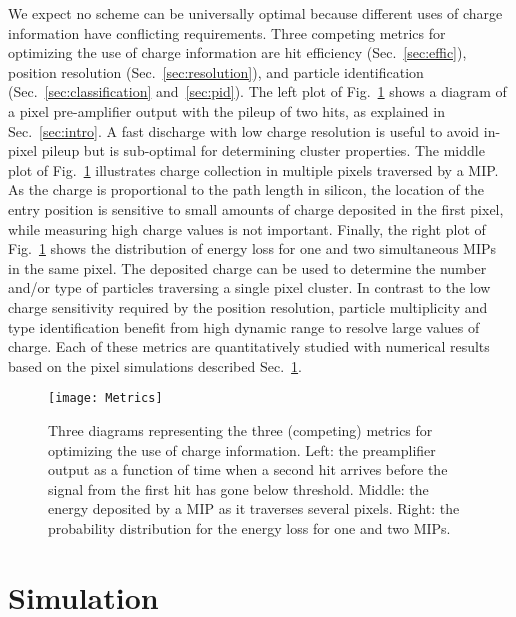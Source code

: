 \documentclass[12pt]{article}
\begin{document}
We expect no scheme can be universally optimal because different uses of charge information have conflicting requirements. 
Three competing metrics for optimizing the use of charge information are hit efficiency (Sec.~\ref{sec:effic}), 
position resolution  (Sec.~\ref{sec:resolution}), 
and particle identification (Sec.~\ref{sec:classification} and~\ref{sec:pid}). 
The left plot of Fig.~\ref{fig:ToTschematic} shows a diagram of a pixel pre-amplifier output with the pileup of two hits,
as explained in Sec.~\ref{sec:intro}. A fast discharge with low charge resolution is useful to avoid in-pixel pileup but is sub-optimal for determining cluster properties. 
The middle plot of Fig.~\ref{fig:ToTschematic} illustrates charge collection in multiple pixels traversed by a MIP.  
As the charge is proportional to the path length in silicon, the location of the entry position is sensitive to small amounts of charge deposited in the first pixel, while measuring high charge values is not important. 
Finally, the right plot of Fig.~\ref{fig:ToTschematic} shows the distribution of energy loss for one and two simultaneous MIPs in the same pixel.  The deposited charge can be used to determine the number and/or type of particles traversing a single pixel cluster. 
In contrast to the low charge sensitivity required by the position resolution, particle multiplicity and type identification benefit from high dynamic range to resolve large values of charge.  
Each of these metrics are quantitatively studied with numerical results based on the pixel simulations described 
Sec.~\ref{sec:sim}.

\begin{figure}[h!]
\centering
\texttt{[image: Metrics]}
\caption{Three diagrams representing the three (competing) metrics for optimizing the use of charge information.  Left: the preamplifier output as a function of time when a second hit arrives before the signal from the first hit has gone below threshold.  Middle: the energy deposited by a MIP as it traverses several pixels.  Right: the probability distribution for the energy loss for one and two MIPs.}
\label{fig:ToTschematic}
\end{figure}

\section{Simulation}
\label{sec:sim}
\end{document}
